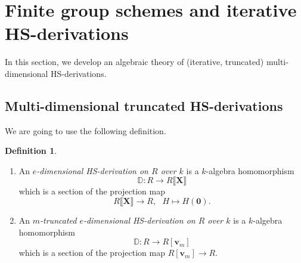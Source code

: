 \documentclass[10pt]{amsart}
\theoremstyle{definition}
\newtheorem{definition}[theorem]{Definition}
\begin{document}
\section{Finite group schemes and iterative HS-derivations}\label{secsetup}
\noindent
In this section, we develop an algebraic theory of (iterative, truncated) multi-dimensional HS-derivations.


\subsection{Multi-dimensional truncated HS-derivations}\label{sectrun} We are going to use the following definition.
\begin{definition}\label{hstrdef}
\begin{enumerate}
\item  An \emph{$e$-dimensional HS-derivation on $R$ over $k$}  is a $k$-algebra homomorphism
$$\mathbb{D}:R\to R\llbracket \mathbf{X}\rrbracket$$
which is a section of the projection map
$$R\llbracket \mathbf{X}\rrbracket\to R,\ \ \ H\mapsto H(\mathbf{0}).$$

\item An \emph{$m$-truncated $e$-dimensional HS-derivation on $R$ over $k$}  is a $k$-algebra homomorphism
$$\mathbb{D}:R\to R[\mathbf{v}_m]$$
which is a section of the projection map $R[\mathbf{v}_m]\to R$.
\end{enumerate}
\end{definition}
\end{document}
